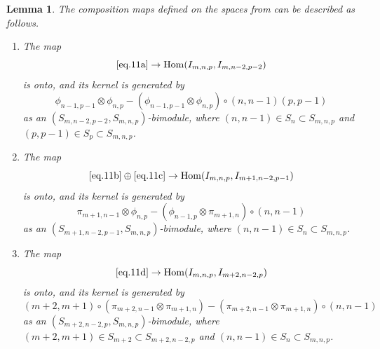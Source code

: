 \documentclass[11pt]{article}
\theoremstyle{plain}
\newtheorem{lemma}{Lemma}[section]
\theoremstyle{nonumberplain}
\theoremstyle{plain}
\theoremstyle{nonumberplain}
\DeclareMathOperator{\Hom}{\mathrm{Hom}}
\begin{document}
\begin{lemma}\label{le.2}
  The composition maps defined on the spaces from  can be described as follows. 
  \begin{enumerate}
     \renewcommand{\labelenumi}{(\alph{enumi})}
      \item The map    
        \begin{equation*}
          \Cref{eq.11a}\to \Hom(I_{m,n,p},I_{m,n-2,p-2})
        \end{equation*}
        is onto, and its kernel is generated by
        \begin{equation*}
          \phi_{n-1,p-1}\otimes \phi_{n,p} - (\phi_{n-1,p-1}\otimes \phi_{n,p})\circ(n,n-1)(p,p-1)
        \end{equation*}
        as an $(S_{m,n-2,p-2},S_{m,n,p})$-bimodule, where $(n,n-1) \in S_n\subset S_{m,n,p}$ and $(p,p-1) \in S_p\subset S_{m,n,p}$. 
      \item The map  
        \begin{equation*}
          \Cref{eq.11b}\oplus \Cref{eq.11c}\to \Hom(I_{m,n,p},I_{m+1,n-2,p-1})
        \end{equation*}
        is onto, and its kernel is generated by
        \begin{equation*}
          \pi_{m+1,n-1}\otimes\phi_{n,p}-(\phi_{n-1,p}\otimes\pi_{m+1,n})\circ(n,n-1)
        \end{equation*}
        as an $(S_{m+1,n-2,p-1},S_{m,n,p})$-bimodule, where $(n,n-1)\in S_n\subset S_{m,n,p}$.  
      \item The map  
        \begin{equation}\label{eq.2c_pre}
          \Cref{eq.11d}\to \Hom(I_{m,n,p},I_{m+2,n-2,p})
        \end{equation}
        is onto, and its kernel is generated by
        \begin{equation}\label{eq.2c}
          (m+2,m+1)\circ(\pi_{m+2,n-1}\otimes \pi_{m+1,n}) - (\pi_{m+2,n-1}\otimes\pi_{m+1,n})\circ (n,n-1)
        \end{equation}
        as an $(S_{m+2,n-2,p},S_{m,n,p})$-bimodule, where $(m+2,m+1) \in S_{m+2}\subset S_{m+2,n-2,p}$ and $(n,n-1) \in S_n\subset S_{m,n,p}$. 
   \end{enumerate}
\end{lemma}
\end{document}
